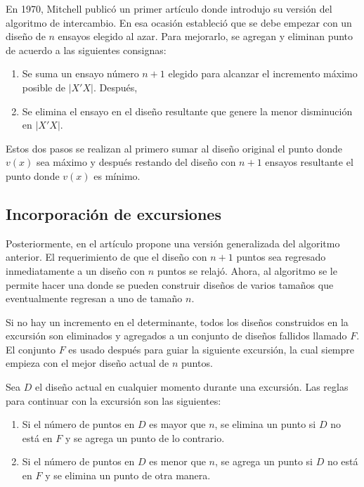 En 1970, Mitchell publicó un primer artículo donde introdujo su versión del algoritmo de intercambio. En esa ocasión estableció que se debe empezar con un diseño de $n$ ensayos elegido al azar. Para mejorarlo, se agregan y eliminan punto de acuerdo a las siguientes consignas: 

\begin{enumerate}
	\item Se suma un ensayo número $n+1$ elegido para alcanzar el incremento máximo posible de $|X'X|$. Después, 
	\item Se elimina el ensayo en el diseño resultante que genere la menor disminución en  $|X'X|$. 
\end{enumerate}

Estos dos pasos se realizan al primero sumar al diseño original el punto donde $v(x)$ sea máximo y después restando del diseño con $n+1$ ensayos resultante el punto donde $v(x)$ es mínimo.

\subsection{Incorporación de excursiones}

Posteriormente, en el artículo \cite{mitchelldetmax} propone una versión generalizada del algoritmo anterior. El requerimiento de que el diseño con $n+1$ puntos sea regresado inmediatamente a un diseño con $n$ puntos se relajó. Ahora, al algoritmo se le permite hacer una  donde se pueden construir diseños de varios tamaños que eventualmente regresan a uno de tamaño $n$.  

Si no hay un incremento en el determinante, todos los diseños construidos en la excursión son eliminados y agregados a un conjunto de diseños fallidos llamado $F$. El conjunto $F$ es usado después para guiar la siguiente excursión, la cual siempre empieza con el mejor diseño actual de $n$ puntos. 

Sea $D$ el diseño actual en cualquier momento durante una excursión. Las reglas para continuar con la excursión son las siguientes:

\begin{enumerate}
	\item Si el número de puntos en $D$ es mayor que $n$, se elimina un punto si $D$ no está en $F$ y se agrega un punto de lo contrario. 
	
	\item Si el número de puntos en $D$ es menor que $n$, se agrega un punto si $D$ no está en $F$ y se elimina un punto de otra manera. 
\end{enumerate}


